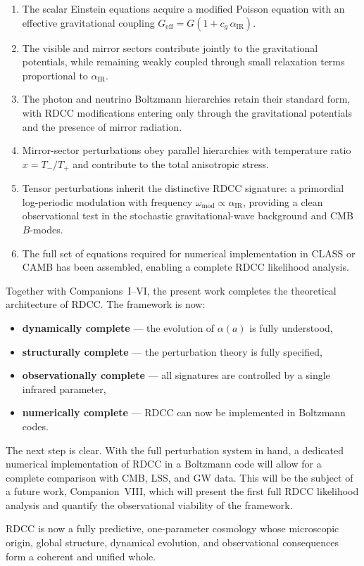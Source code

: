 \documentclass[11pt,a4paper]{article}
\begin{document}
\begin{enumerate}
    \item The scalar Einstein equations acquire a modified Poisson equation with an effective
    gravitational coupling $G_{\mathrm{eff}} = G(1 + c_{g}\,\alpha_{\mathrm{IR}})$.

    \item The visible and mirror sectors contribute jointly to the gravitational potentials, while
    remaining weakly coupled through small relaxation terms proportional to
    $\alpha_{\mathrm{IR}}$.

    \item The photon and neutrino Boltzmann hierarchies retain their standard form, with RDCC
    modifications entering only through the gravitational potentials and the presence of
    mirror radiation.

    \item Mirror-sector perturbations obey parallel hierarchies with temperature ratio
    $x = T_{-}/T_{+}$ and contribute to the total anisotropic stress.

    \item Tensor perturbations inherit the distinctive RDCC signature: a primordial
    log-periodic modulation with frequency $\omega_{\mathrm{mod}} \propto \alpha_{\mathrm{IR}}$, providing
    a clean observational test in the stochastic gravitational-wave background and CMB
    $B$-modes.

    \item The full set of equations required for numerical implementation in CLASS or CAMB
    has been assembled, enabling a complete RDCC likelihood analysis.
\end{enumerate}

Together with Companions~I–VI, the present work completes the theoretical architecture of
RDCC. The framework is now:

\begin{itemize}
    \item \textbf{dynamically complete} — the evolution of $\alpha(a)$ is fully understood,
    \item \textbf{structurally complete} — the perturbation theory is fully specified,
    \item \textbf{observationally complete} — all signatures are controlled by a single infrared
    parameter,
    \item \textbf{numerically complete} — RDCC can now be implemented in Boltzmann codes.
\end{itemize}

The next step is clear. With the full perturbation system in hand, a dedicated numerical
implementation of RDCC in a Boltzmann code will allow for a complete comparison with
CMB, LSS, and GW data. This will be the subject of a future work, Companion~VIII, which
will present the first full RDCC likelihood analysis and quantify the observational viability of
the framework.

RDCC is now a fully predictive, one-parameter cosmology whose microscopic origin, global
structure, dynamical evolution, and observational consequences form a coherent and unified
whole.
\end{document}
